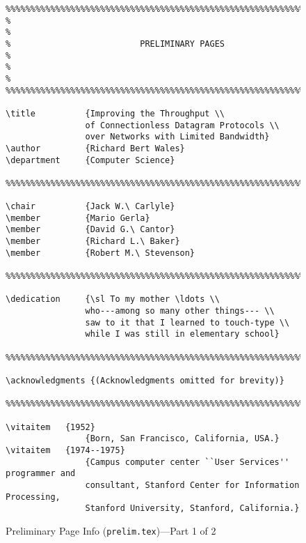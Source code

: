 \begin {figure}
{\small
\begin{verbatim}
%%%%%%%%%%%%%%%%%%%%%%%%%%%%%%%%%%%%%%%%%%%%%%%%%%%%%%%%%%%%%%%%%%%%%%%%
%                                                                      %
%                          PRELIMINARY PAGES                           %
%                                                                      %
%%%%%%%%%%%%%%%%%%%%%%%%%%%%%%%%%%%%%%%%%%%%%%%%%%%%%%%%%%%%%%%%%%%%%%%%

\title          {Improving the Throughput \\
                of Connectionless Datagram Protocols \\
                over Networks with Limited Bandwidth}
\author         {Richard Bert Wales}
\department     {Computer Science}

%%%%%%%%%%%%%%%%%%%%%%%%%%%%%%%%%%%%%%%%%%%%%%%%%%%%%%%%%%%%%%%%%%%%%%%%

\chair          {Jack W.\ Carlyle}
\member         {Mario Gerla}
\member         {David G.\ Cantor}
\member         {Richard L.\ Baker}
\member         {Robert M.\ Stevenson}

%%%%%%%%%%%%%%%%%%%%%%%%%%%%%%%%%%%%%%%%%%%%%%%%%%%%%%%%%%%%%%%%%%%%%%%%

\dedication     {\sl To my mother \ldots \\
                who---among so many other things--- \\
                saw to it that I learned to touch-type \\
                while I was still in elementary school}

%%%%%%%%%%%%%%%%%%%%%%%%%%%%%%%%%%%%%%%%%%%%%%%%%%%%%%%%%%%%%%%%%%%%%%%%

\acknowledgments {(Acknowledgments omitted for brevity)}

%%%%%%%%%%%%%%%%%%%%%%%%%%%%%%%%%%%%%%%%%%%%%%%%%%%%%%%%%%%%%%%%%%%%%%%%

\vitaitem   {1952}
                {Born, San Francisco, California, USA.}
\vitaitem   {1974--1975}
                {Campus computer center ``User Services'' programmer and
                consultant, Stanford Center for Information Processing,
                Stanford University, Stanford, California.}
\end{verbatim}
}
\caption {Preliminary Page Info ({\tt prelim.tex})---Part 1 of 2}
\label {fig:prelim1}
\end {figure}

